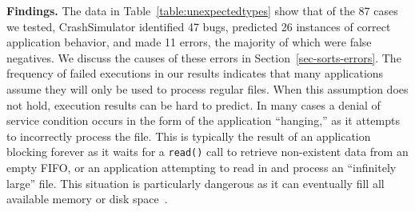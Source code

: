 {\bf Findings.}
The data in Table~\ref{table:unexpectedtypes} show that of the 87 cases we
tested, CrashSimulator identified 47 bugs,
predicted 26 instances of correct application behavior,
and made 11 errors,
the majority of which were false negatives.
We discuss the causes of these errors
in Section~\ref{sec-sorts-errors}.
The frequency of failed executions in our results
indicates that many
applications assume they will only be used to process
regular files.  When this assumption does not hold, execution results
can be hard to predict.
In many cases a denial of
service condition occurs in the form of the application ``hanging,'' as it
attempts to incorrectly process the file.
This is typically the result of
an application blocking forever as it waits for a {\tt read()}
call to retrieve non-existent data from an empty FIFO,
or an application attempting
to read in and process an
``infinitely large'' file.
This situation is particularly dangerous as
it can eventually
fill all available memory or disk space~\cite{Cappos_CCS_08}.



